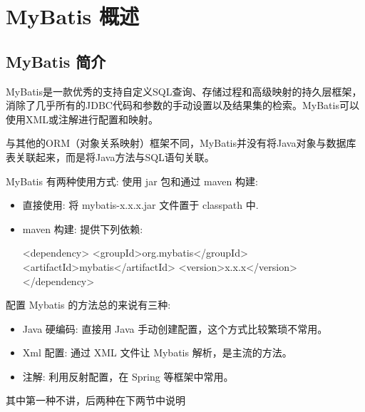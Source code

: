 \section{MyBatis 概述}

\subsection{MyBatis 简介}

MyBatis是一款优秀的支持自定义SQL查询、存储过程和高级映射的持久层框架，消除了几乎所有的JDBC代码和参数的手动设置以及结果集的检索。MyBatis可以使用XML或注解进行配置和映射。

与其他的ORM（对象关系映射）框架不同，MyBatis并没有将Java对象与数据库表关联起来，而是将Java方法与SQL语句关联。

MyBatis 有两种使用方式: 使用 jar 包和通过 maven 构建:
\begin{itemize}
    \item 直接使用: 将 mybatis-x.x.x.jar 文件置于 classpath 中.
    \item maven 构建: 提供下列依赖:
\begin{xml}
<dependency>
    <groupId>org.mybatis</groupId>
    <artifactId>mybatis</artifactId>
    <version>x.x.x</version>
</dependency>
\end{xml}
\end{itemize}

配置 Mybatis 的方法总的来说有三种:
\begin{itemize}
    \item Java 硬编码: 直接用 Java 手动创建配置，这个方式比较繁琐不常用。
    \item Xml 配置: 通过 XML 文件让 Mybatis 解析，是主流的方法。
    \item 注解: 利用反射配置，在 Spring 等框架中常用。
\end{itemize}

其中第一种不讲，后两种在下两节中说明